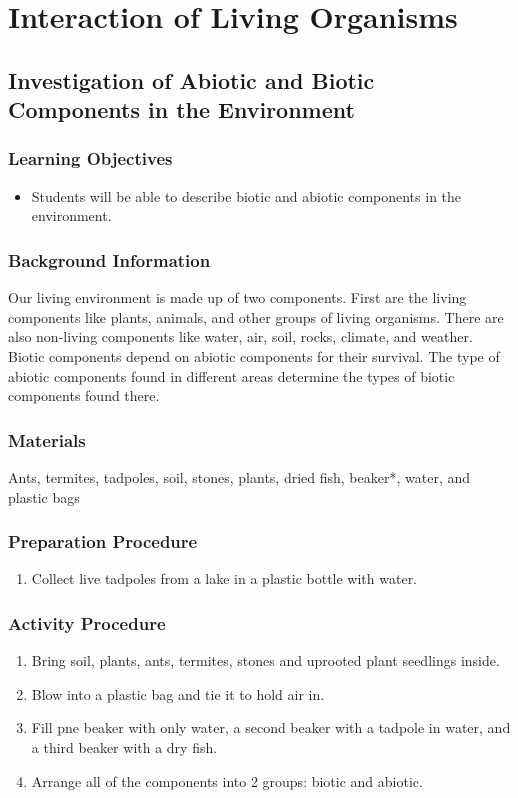 \section{Interaction of Living Organisms}

\subsection{Investigation of Abiotic and Biotic Components in the Environment}

\subsubsection*{Learning Objectives}
\begin{itemize}
\item{Students will be able to describe biotic and abiotic components in the environment.}
\end{itemize}

\subsubsection*{Background Information}
Our living environment is made up of two components. First are the living components like plants, animals, and other groups of living organisms. There are also non-living components like water, air, soil, rocks, climate, and weather. Biotic components depend on abiotic components for their survival. The type of abiotic components found in different areas determine the types of biotic components found there.

\subsubsection*{Materials}
Ants, termites, tadpoles, soil, stones, plants, dried fish, beaker*, water, and plastic bags

\subsubsection*{Preparation Procedure}
\begin{enumerate}
\item{Collect live tadpoles from a lake in a plastic bottle with water.}
\end{enumerate}

\subsubsection*{Activity Procedure}
\begin{enumerate}
\item{Bring soil, plants, ants, termites, stones and uprooted plant seedlings inside.}
\item{Blow into a plastic bag and tie it to hold air in.}
\item{Fill pne beaker with only water, a second beaker with a tadpole in water, and a third beaker with a dry fish.}
\item{Arrange all of the components into 2 groups: biotic and abiotic.}
\end{enumerate}

